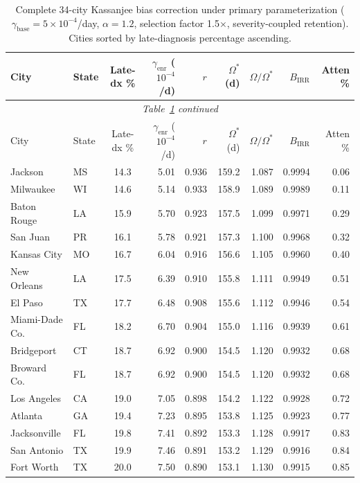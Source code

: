 \documentclass[11pt]{article}
\begin{document}
\begin{longtable}{llcrrrrrr}
\caption{Complete 34-city Kassanjee bias correction under primary parameterization ($\gamma_{\mathrm{base}} = 5\times10^{-4}$/day, $\alpha = 1.2$, selection factor 1.5$\times$, severity-coupled retention). Cities sorted by late-diagnosis percentage ascending.} \label{tab:full_34} \\
\toprule
City & State & Late-dx \% & $\gamma_{\mathrm{enr}}$ ($10^{-4}$/d) & $r$ & $\Omega^*$ (d) & $\Omega/\Omega^*$ & $B_{\mathrm{IRR}}$ & Atten \% \\
\midrule
\endfirsthead
\multicolumn{9}{c}{\textit{Table~\ref{tab:full_34} continued}} \\
\toprule
City & State & Late-dx \% & $\gamma_{\mathrm{enr}}$ ($10^{-4}$/d) & $r$ & $\Omega^*$ (d) & $\Omega/\Omega^*$ & $B_{\mathrm{IRR}}$ & Atten \% \\
\midrule
\endhead
\bottomrule
\endfoot
Jackson & MS & 14.3 & 5.01 & 0.936 & 159.2 & 1.087 & 0.9994 & 0.06 \\
Milwaukee & WI & 14.6 & 5.14 & 0.933 & 158.9 & 1.089 & 0.9989 & 0.11 \\
Baton Rouge & LA & 15.9 & 5.70 & 0.923 & 157.5 & 1.099 & 0.9971 & 0.29 \\
San Juan & PR & 16.1 & 5.78 & 0.921 & 157.3 & 1.100 & 0.9968 & 0.32 \\
Kansas City & MO & 16.7 & 6.04 & 0.916 & 156.6 & 1.105 & 0.9960 & 0.40 \\
New Orleans & LA & 17.5 & 6.39 & 0.910 & 155.8 & 1.111 & 0.9949 & 0.51 \\
El Paso & TX & 17.7 & 6.48 & 0.908 & 155.6 & 1.112 & 0.9946 & 0.54 \\
Miami-Dade Co. & FL & 18.2 & 6.70 & 0.904 & 155.0 & 1.116 & 0.9939 & 0.61 \\
Bridgeport & CT & 18.7 & 6.92 & 0.900 & 154.5 & 1.120 & 0.9932 & 0.68 \\
Broward Co. & FL & 18.7 & 6.92 & 0.900 & 154.5 & 1.120 & 0.9932 & 0.68 \\
Los Angeles & CA & 19.0 & 7.05 & 0.898 & 154.2 & 1.122 & 0.9928 & 0.72 \\
Atlanta & GA & 19.4 & 7.23 & 0.895 & 153.8 & 1.125 & 0.9923 & 0.77 \\
Jacksonville & FL & 19.8 & 7.41 & 0.892 & 153.3 & 1.128 & 0.9917 & 0.83 \\
San Antonio & TX & 19.9 & 7.46 & 0.891 & 153.2 & 1.129 & 0.9916 & 0.84 \\
Fort Worth & TX & 20.0 & 7.50 & 0.890 & 153.1 & 1.130 & 0.9915 & 0.85 \\

\end{longtable}
\end{document}

